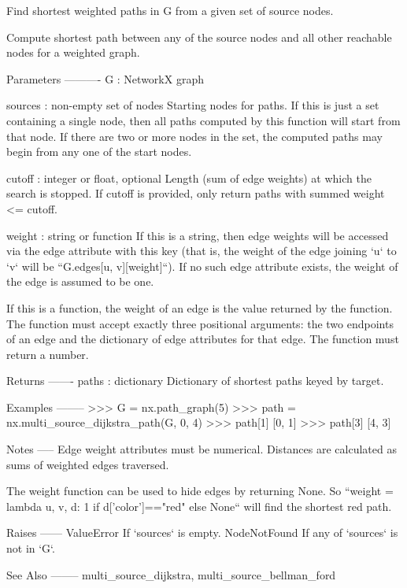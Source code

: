 \begin{DoxyVerb}Find shortest weighted paths in G from a given set of source
nodes.

Compute shortest path between any of the source nodes and all other
reachable nodes for a weighted graph.

Parameters
----------
G : NetworkX graph

sources : non-empty set of nodes
    Starting nodes for paths. If this is just a set containing a
    single node, then all paths computed by this function will start
    from that node. If there are two or more nodes in the set, the
    computed paths may begin from any one of the start nodes.

cutoff : integer or float, optional
    Length (sum of edge weights) at which the search is stopped.
    If cutoff is provided, only return paths with summed weight <= cutoff.

weight : string or function
    If this is a string, then edge weights will be accessed via the
    edge attribute with this key (that is, the weight of the edge
    joining `u` to `v` will be ``G.edges[u, v][weight]``). If no
    such edge attribute exists, the weight of the edge is assumed to
    be one.

    If this is a function, the weight of an edge is the value
    returned by the function. The function must accept exactly three
    positional arguments: the two endpoints of an edge and the
    dictionary of edge attributes for that edge. The function must
    return a number.

Returns
-------
paths : dictionary
    Dictionary of shortest paths keyed by target.

Examples
--------
>>> G = nx.path_graph(5)
>>> path = nx.multi_source_dijkstra_path(G, {0, 4})
>>> path[1]
[0, 1]
>>> path[3]
[4, 3]

Notes
-----
Edge weight attributes must be numerical.
Distances are calculated as sums of weighted edges traversed.

The weight function can be used to hide edges by returning None.
So ``weight = lambda u, v, d: 1 if d['color']=="red" else None``
will find the shortest red path.

Raises
------
ValueError
    If `sources` is empty.
NodeNotFound
    If any of `sources` is not in `G`.

See Also
--------
multi_source_dijkstra, multi_source_bellman_ford\end{DoxyVerb}
 \mbox{\label{namespacenetworkx_1_1algorithms_1_1shortest__paths_1_1weighted_af0469ea487b81adb0071ccaef986efb4}} 
